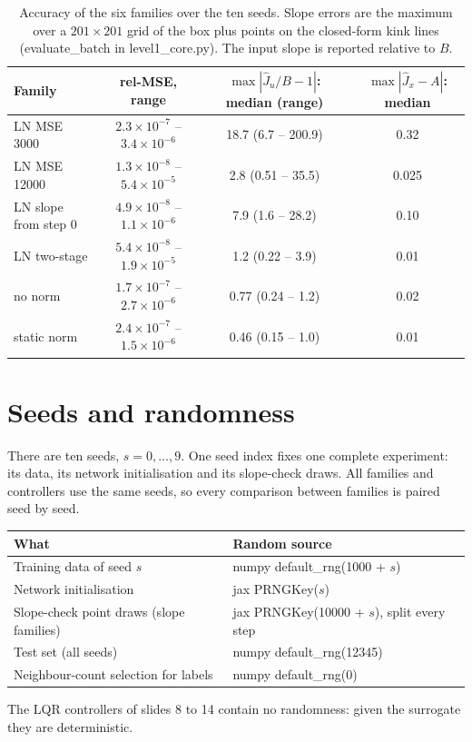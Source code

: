 \documentclass[11pt]{article}
\begin{document}
\begin{table}[H]
\centering
\small
\setlength{\tabcolsep}{4pt}
\begin{tabular}{lccc}
\toprule
Family & rel-MSE, range & $\max|\hat J_u/B-1|$: median (range) & $\max|\hat J_x-A|$: median \\
\midrule
LN MSE 3000 & $2.3\times10^{-7}$ -- $3.4\times10^{-6}$ & 18.7 (6.7 -- 200.9) & 0.32 \\
LN MSE 12000 & $1.3\times10^{-8}$ -- $5.4\times10^{-5}$ & 2.8 (0.51 -- 35.5) & 0.025 \\
LN slope from step 0 & $4.9\times10^{-8}$ -- $1.1\times10^{-6}$ & 7.9 (1.6 -- 28.2) & 0.10 \\
LN two-stage & $5.4\times10^{-8}$ -- $1.9\times10^{-5}$ & 1.2 (0.22 -- 3.9) & 0.01 \\
no norm & $1.7\times10^{-7}$ -- $2.7\times10^{-6}$ & 0.77 (0.24 -- 1.2) & 0.02 \\
static norm & $2.4\times10^{-7}$ -- $1.5\times10^{-6}$ & 0.46 (0.15 -- 1.0) & 0.01 \\
\bottomrule
\end{tabular}
\caption{Accuracy of the six families over the ten seeds. Slope errors are the maximum over a $201\times201$ grid of the box plus points on the closed-form kink lines (evaluate\_batch in level1\_core.py). The input slope is reported relative to $B$.}
\label{tab:acc}
\end{table}

\section{Seeds and randomness}\label{sec:seeds}

There are ten seeds, $s=0,\dots,9$. One seed index fixes one complete experiment: its data, its network initialisation and its slope-check draws. All families and controllers use the same seeds, so every comparison between families is paired seed by seed.

\begin{center}
\begin{tabular}{ll}
\toprule
What & Random source \\
\midrule
Training data of seed $s$ & numpy default\_rng(1000 + $s$) \\
Network initialisation & jax PRNGKey($s$) \\
Slope-check point draws (slope families) & jax PRNGKey(10000 + $s$), split every step \\
Test set (all seeds) & numpy default\_rng(12345) \\
Neighbour-count selection for labels & numpy default\_rng(0) \\
\bottomrule
\end{tabular}
\end{center}
The LQR controllers of slides 8 to 14 contain no randomness: given the surrogate they are deterministic.
\end{document}
